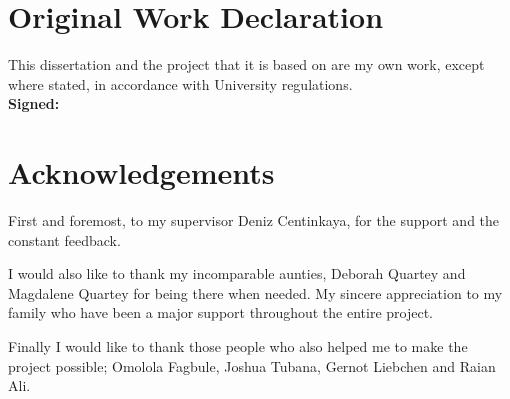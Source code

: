 \documentclass[11pt, twoside]{report}
\begin{document}
\chapter*{Original Work Declaration}

This dissertation and the project that it is based on are my own work, except where stated, in accordance with University regulations.
\\ \newline
\textbf{Signed:}

\chapter*{Acknowledgements}
First and foremost, to my supervisor Deniz Centinkaya, for the support and the constant feedback.

I would also like to thank my incomparable aunties, Deborah Quartey and Magdalene Quartey for  being there when needed. 
My sincere appreciation to my family who have been a major support throughout the entire project.

Finally I would like to thank those people who also helped me to make the project possible; Omolola Fagbule, Joshua Tubana, Gernot Liebchen and Raian Ali.


\tableofcontents

\listoffigures

\listoftables
\clearpage
{}


















\nocite{*} %




\end{document}
